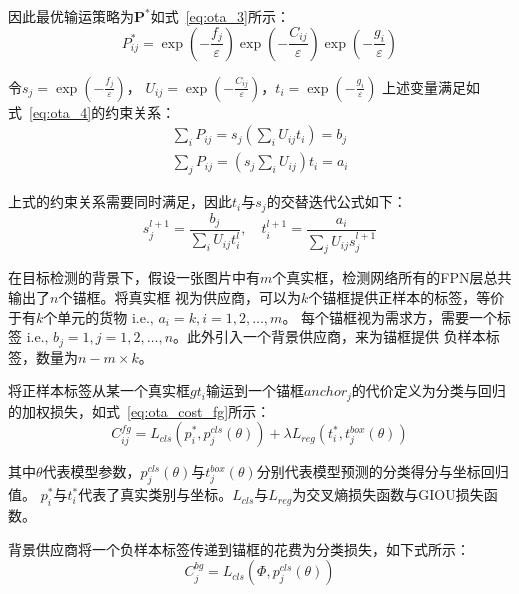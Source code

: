因此最优输运策略为$\mathbf{P}^{*}$如式~\ref{eq:ota_3}所示：
\begin{equation}   
  P_{ij}^* = \exp \left( { - \frac{{{f_j}}}{\varepsilon }} \right)\exp \left( { - \frac{{{C_{ij}}}}{\varepsilon }} \right) \exp \left( { - \frac{{{g_i}}}{\varepsilon }} \right)
  \label{eq:ota_3} 
\end{equation}

令$s_j=\exp \left( { - \frac{{{f_j}}}{\varepsilon }} \right)$， $U_{ij}=\exp \left( { - \frac{{{C_{ij}}}}{\varepsilon }} \right)$，$t_i=\exp \left( { - \frac{{{g_i}}}{\varepsilon }} \right)$
上述变量满足如式~\ref{eq:ota_4}的约束关系：
\begin{equation}   
  \begin{array}{l}
  \sum_{i} P_{i j}=s_{j}\left(\sum_{i} U_{i j} t_{i}\right)=b_{j} \\
  \sum_{j} P_{i j}=\left(s_{j} \sum_{i} U_{i j}\right) t_{i}=a_{i}
  \end{array}
  \label{eq:ota_4} 
\end{equation}

上式的约束关系需要同时满足，因此$t_i$与$s_j$的交替迭代公式如下：
\begin{equation}   
  s_j^{l + 1} = \frac{{{b_j}}}{{\sum\limits_i {{U_{ij}}} t_i^l}},\quad t_i^{l + 1} = \frac{{{a_i}}}{{\sum\limits_j {{U_{ij}}} s_j^{l + 1}}}
  \label{eq:ota_5} 
\end{equation}

在目标检测的背景下，假设一张图片中有$m$个真实框，检测网络所有的FPN层总共输出了$n$个锚框。将真实框
视为供应商，可以为$k$个锚框提供正样本的标签，等价于有$k$个单元的货物$\text { i.e., } a_{i}=k, i=1,2, \ldots, m$。
每个锚框视为需求方，需要一个标签$\text { i.e., } b_{j}=1, j=1,2, \ldots, n$。此外引入一个背景供应商，来为锚框提供
负样本标签，数量为$n - m \times k$。

将正样本标签从某一个真实框$gt_{i}$输运到一个锚框$anchor_j$的代价定义为分类与回归的加权损失，如式~\ref{eq:ota_cost_fg}所示：
\begin{equation}   
  C_{ij}^{fg} = {L_{cls}}\left( {p_i^*,p_j^{cls}(\theta )} \right) + \lambda {L_{reg}}\left( {t_i^*,t_j^{box}(\theta )} \right)
  \label{eq:ota_cost_fg} 
\end{equation}

其中$\theta$代表模型参数，$p_j^{cls}(\theta )$与$t_j^{box}(\theta )$分别代表模型预测的分类得分与坐标回归值。
$p_i^*$与$t_i^*$代表了真实类别与坐标。$L_{cls}$与$L_{reg}$为交叉熵损失函数与GIOU损失函数。

背景供应商将一个负样本标签传递到锚框的花费为分类损失，如下式所示：
\begin{equation}   
  C_j^{bg} = {L_{cls}}\left( {\Phi ,p_j^{cls}(\theta )} \right)
  \label{eq:ota_cost_bg} 
\end{equation}

